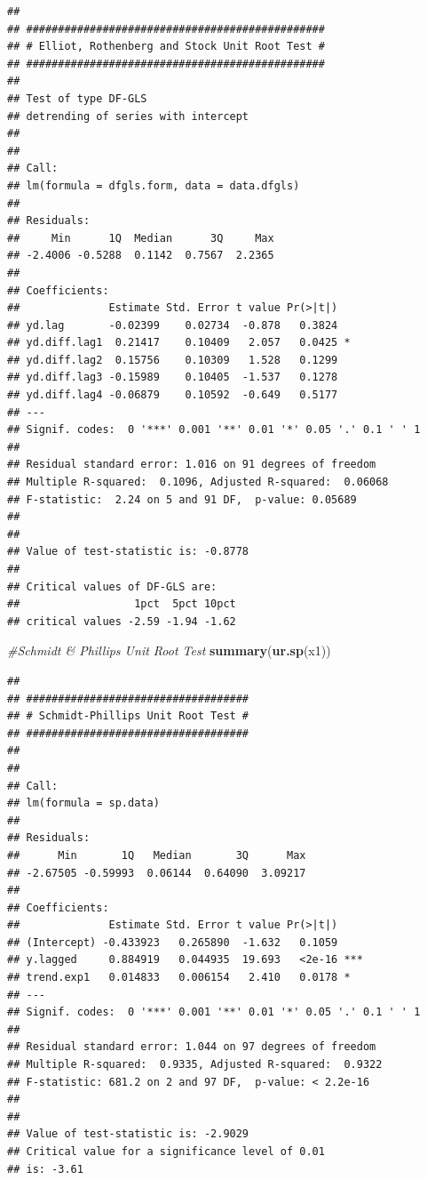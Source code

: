 \documentclass[]{book}
\newenvironment{Shaded}{\begin{snugshade}}{\end{snugshade}}
\newcommand{\CommentTok}[1]{\textcolor[rgb]{0.56,0.35,0.01}{\textit{#1}}}
\newcommand{\KeywordTok}[1]{\textcolor[rgb]{0.13,0.29,0.53}{\textbf{#1}}}
\newcommand{\NormalTok}[1]{#1}
\begin{document}
\begin{verbatim}
## 
## ############################################### 
## # Elliot, Rothenberg and Stock Unit Root Test # 
## ############################################### 
## 
## Test of type DF-GLS 
## detrending of series with intercept 
## 
## 
## Call:
## lm(formula = dfgls.form, data = data.dfgls)
## 
## Residuals:
##     Min      1Q  Median      3Q     Max 
## -2.4006 -0.5288  0.1142  0.7567  2.2365 
## 
## Coefficients:
##              Estimate Std. Error t value Pr(>|t|)  
## yd.lag       -0.02399    0.02734  -0.878   0.3824  
## yd.diff.lag1  0.21417    0.10409   2.057   0.0425 *
## yd.diff.lag2  0.15756    0.10309   1.528   0.1299  
## yd.diff.lag3 -0.15989    0.10405  -1.537   0.1278  
## yd.diff.lag4 -0.06879    0.10592  -0.649   0.5177  
## ---
## Signif. codes:  0 '***' 0.001 '**' 0.01 '*' 0.05 '.' 0.1 ' ' 1
## 
## Residual standard error: 1.016 on 91 degrees of freedom
## Multiple R-squared:  0.1096, Adjusted R-squared:  0.06068 
## F-statistic:  2.24 on 5 and 91 DF,  p-value: 0.05689
## 
## 
## Value of test-statistic is: -0.8778 
## 
## Critical values of DF-GLS are:
##                  1pct  5pct 10pct
## critical values -2.59 -1.94 -1.62
\end{verbatim}

\begin{Shaded}
\begin{Highlighting}[]
\CommentTok{#Schmidt & Phillips Unit Root Test}
\KeywordTok{summary}\NormalTok{(}\KeywordTok{ur.sp}\NormalTok{(x1))}
\end{Highlighting}
\end{Shaded}

\begin{verbatim}
## 
## ################################### 
## # Schmidt-Phillips Unit Root Test # 
## ################################### 
## 
## 
## Call:
## lm(formula = sp.data)
## 
## Residuals:
##      Min       1Q   Median       3Q      Max 
## -2.67505 -0.59993  0.06144  0.64090  3.09217 
## 
## Coefficients:
##              Estimate Std. Error t value Pr(>|t|)    
## (Intercept) -0.433923   0.265890  -1.632   0.1059    
## y.lagged     0.884919   0.044935  19.693   <2e-16 ***
## trend.exp1   0.014833   0.006154   2.410   0.0178 *  
## ---
## Signif. codes:  0 '***' 0.001 '**' 0.01 '*' 0.05 '.' 0.1 ' ' 1
## 
## Residual standard error: 1.044 on 97 degrees of freedom
## Multiple R-squared:  0.9335, Adjusted R-squared:  0.9322 
## F-statistic: 681.2 on 2 and 97 DF,  p-value: < 2.2e-16
## 
## 
## Value of test-statistic is: -2.9029 
## Critical value for a significance level of 0.01 
## is: -3.61
\end{verbatim}


\end{document}
